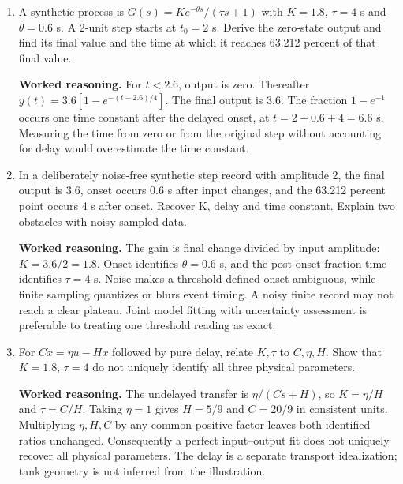 \documentclass[10pt,a4paper]{article}
\newcommand{\answer}{\par\smallskip\textbf{Worked reasoning.} }
\begin{document}
\begin{enumerate}
\item A synthetic process is $G(s)=K e^{-\theta s}/(\tau s+1)$ with $K=1.8$, $\tau=4$ s and $\theta=0.6$ s. A 2-unit step starts at $t_0=2$ s. Derive the zero-state output and find its final value and the time at which it reaches 63.212 percent of that final value.
\answer For $t<2.6$, output is zero. Thereafter $y(t)=3.6[1-e^{-(t-2.6)/4}]$. The final output is 3.6. The fraction $1-e^{-1}$ occurs one time constant after the delayed onset, at $t=2+0.6+4=6.6$ s. Measuring the time from zero or from the original step without accounting for delay would overestimate the time constant.
\item In a deliberately noise-free synthetic step record with amplitude 2, the final output is 3.6, onset occurs 0.6 s after input changes, and the 63.212 percent point occurs 4 s after onset. Recover K, delay and time constant. Explain two obstacles with noisy sampled data.
\answer The gain is final change divided by input amplitude: $K=3.6/2=1.8$. Onset identifies $\theta=0.6$ s, and the post-onset fraction time identifies $\tau=4$ s. Noise makes a threshold-defined onset ambiguous, while finite sampling quantizes or blurs event timing. A noisy finite record may not reach a clear plateau. Joint model fitting with uncertainty assessment is preferable to treating one threshold reading as exact.
\item For $C\dot x=\eta u-Hx$ followed by pure delay, relate $K,\tau$ to $C,\eta,H$. Show that $K=1.8$, $\tau=4$ do not uniquely identify all three physical parameters.
\answer The undelayed transfer is $\eta/(Cs+H)$, so $K=\eta/H$ and $\tau=C/H$. Taking $\eta=1$ gives $H=5/9$ and $C=20/9$ in consistent units. Multiplying $\eta,H,C$ by any common positive factor leaves both identified ratios unchanged. Consequently a perfect input--output fit does not uniquely recover all physical parameters. The delay is a separate transport idealization; tank geometry is not inferred from the illustration.
\end{enumerate}
\end{document}

